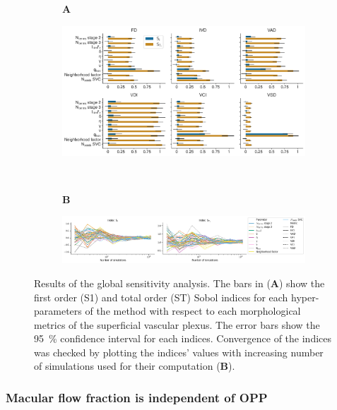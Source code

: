 \documentclass[11pt,]{article}
\begin{document}
\begin{figure}[ht!]
  \centering
  \begin{subfigure}[t]{.03\textwidth}
    \textbf{A}
  \end{subfigure}
  \begin{subfigure}[t]{.95\textwidth}
    \includegraphics[width=\textwidth, valign=t]{SobolIndices}
  \end{subfigure}
  \\
  \begin{subfigure}[t]{.03\textwidth}
    \textbf{B}
  \end{subfigure}
  \begin{subfigure}[t]{.95\textwidth}
    \includegraphics[width=\textwidth, valign=t]{ConvergenceSobolIndices}
  \end{subfigure}
  \caption{Results of the global sensitivity analysis. The bars in (\textbf{A}) show the first order (S1) and total order (ST) Sobol indices for each hyper-parameters of the method with respect to each morphological metrics of the superficial vascular plexus. 
    The error bars show the \SI{95}{\%} confidence interval for each indices. Convergence of the indices was checked by plotting the indices' values with increasing number of simulations used for their computation (\textbf{B}).}
  \label{fig:gsa}
\end{figure}

\subsubsection{Macular flow fraction is independent of OPP}\label{sec:UQ}
\end{document}
